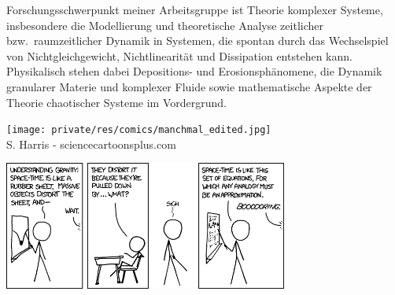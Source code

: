 \begin{multicols}{2}
Forschungsschwerpunkt meiner Arbeitsgruppe ist Theorie komplexer Systeme, insbesondere die Modellierung und theoretische Analyse zeitlicher bzw.\ raumzeitlicher Dynamik in Systemen, die spontan durch das Wechselspiel von Nichtgleichgewicht, Nichtlinearität und Dissipation entstehen kann. Physikalisch stehen dabei Depositions- und Erosionsphänomene, die Dynamik granularer Materie und komplexer Fluide sowie mathematische Aspekte der Theorie chaotischer Systeme im Vordergrund.

\begin{center}
\texttt{[image: private/res/comics/manchmal\_edited.jpg]}\\
{\footnotesize 
S. Harris - sciencecartoonsplus.com}
\end{center}
\end{multicols}

\medskip

\begin{center}
	\includegraphics[width=0.7\textwidth]{res/xkcd/895_teaching_physics.png}
\end{center}

\newpage

